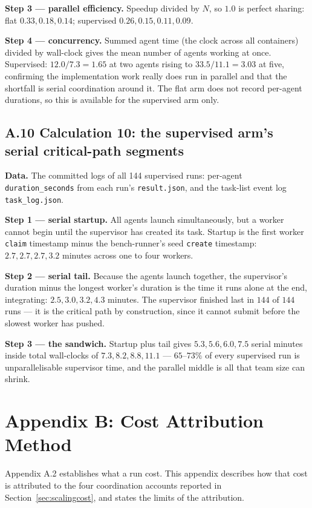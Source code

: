 \documentclass[11pt,a4paper]{article}
\begin{document}
\textbf{Step 3 --- parallel efficiency.} Speedup divided by $N$, so $1.0$ is perfect sharing: flat $0.33, 0.18, 0.14$; supervised $0.26, 0.15, 0.11, 0.09$.

\textbf{Step 4 --- concurrency.} Summed agent time (the clock across all containers) divided by wall-clock gives the mean number of agents working at once. Supervised: $12.0/7.3 = 1.65$ at two agents rising to $33.5/11.1 = 3.03$ at five, confirming the implementation work really does run in parallel and that the shortfall is serial coordination around it. The flat arm does not record per-agent durations, so this is available for the supervised arm only.

\subsection*{A.10 \quad Calculation 10: the supervised arm's serial critical-path segments}

\textbf{Data.} The committed logs of all 144 supervised runs: per-agent \texttt{duration\_seconds} from each run's \texttt{result.json}, and the task-list event log \texttt{task\_log.json}.

\textbf{Step 1 --- serial startup.} All agents launch simultaneously, but a worker cannot begin until the supervisor has created its task. Startup is the first worker \texttt{claim} timestamp minus the bench-runner's seed \texttt{create} timestamp: $2.7, 2.7, 2.7, 3.2$ minutes across one to four workers.

\textbf{Step 2 --- serial tail.} Because the agents launch together, the supervisor's duration minus the longest worker's duration is the time it runs alone at the end, integrating: $2.5, 3.0, 3.2, 4.3$ minutes. The supervisor finished last in $144$ of $144$ runs --- it is the critical path by construction, since it cannot submit before the slowest worker has pushed.

\textbf{Step 3 --- the sandwich.} Startup plus tail gives $5.3, 5.6, 6.0, 7.5$ serial minutes inside total wall-clocks of $7.3, 8.2, 8.8, 11.1$ --- $65$--$73\%$ of every supervised run is unparallelisable supervisor time, and the parallel middle is all that team size can shrink.


\section*{Appendix B: Cost Attribution Method}

Appendix A.2 establishes what a run cost. This appendix describes how that cost is
attributed to the four coordination accounts reported in Section~\ref{sec:scalingcost},
and states the limits of the attribution.
\end{document}

